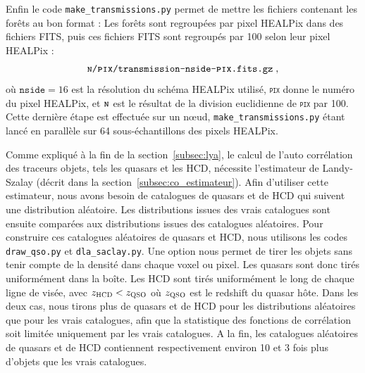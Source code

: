 Enfin le code \texttt{make\_transmissions.py} permet de mettre les fichiers contenant les forêts au bon format :
Les forêts sont regroupées par pixel HEALPix \autocite{Gorski2004} dans des fichiers FITS, puis ces fichiers FITS sont regroupés par 100 selon leur pixel HEALPix :
\begin{equation*}
  \texttt{\textsc{n}/\textsc{pix}/transmission-nside-\textsc{pix}.fits.gz} \; ,
\end{equation*}
où $\texttt{nside} = \num{16}$ est la résolution du schéma HEALPix utilisé, \texttt{\textsc{pix}} donne le numéro du pixel HEALPix, et $\texttt{\textsc{n}}$ est le résultat de la division euclidienne de \texttt{\textsc{pix}} par \num{100}.
Cette dernière étape est effectuée sur un nœud, \texttt{make\_transmissions.py} étant lancé en parallèle sur 64 sous-échantillons des pixels HEALPix.

Comme expliqué à la fin de la section~\ref{subsec:lya}, le calcul de l'auto corrélation des traceurs objets, tels les quasars et les HCD, nécessite l'estimateur de Landy-Szalay (décrit dans la section~\ref{subsec:co_estimateur}). Afin d'utiliser cette estimateur, nous avons besoin de catalogues de quasars et de HCD qui suivent une distribution aléatoire.
Les distributions issues des vrais catalogues sont ensuite comparées aux distributions issues des catalogues aléatoires.
Pour construire ces catalogues aléatoires de quasars et HCD, nous utilisons les codes \texttt{draw\_qso.py} et \texttt{dla\_saclay.py}. Une option nous permet de tirer les objets sans tenir compte de la densité dans chaque voxel ou pixel. Les quasars sont donc tirés uniformément dans la boîte. Les HCD sont tirés uniformément le long de chaque ligne de visée, avec $z_{\textsc{HCD}} < z_{\textsc{QSO}}$ où $z_{\textsc{QSO}}$ est le redshift du quasar hôte. Dans les deux cas, nous tirons plus de quasars et de HCD pour les distributions aléatoires que pour les vrais catalogues, afin que la statistique des fonctions de corrélation soit limitée uniquement par les vrais catalogues. A la fin, les catalogues aléatoires de quasars et de HCD contiennent respectivement environ 10 et 3 fois plus d'objets que les vrais catalogues.


